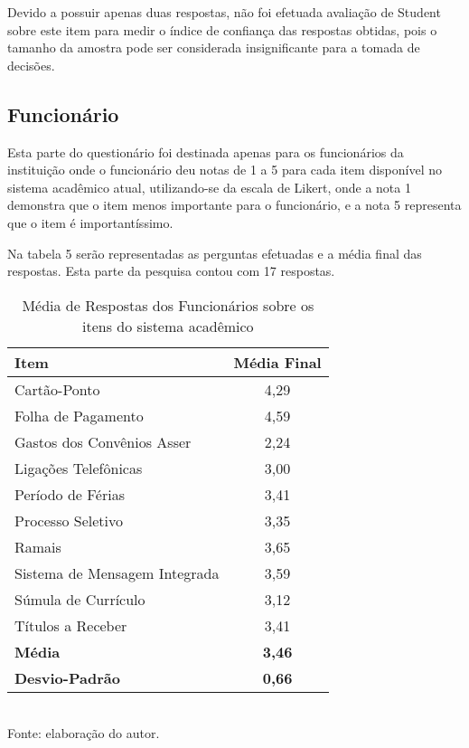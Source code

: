 Devido a possuir apenas duas respostas, não foi efetuada avaliação de Student sobre este item para medir o índice de confiança das respostas obtidas, pois o tamanho da amostra pode ser considerada insignificante para a tomada de decisões.


\subsection{Funcionário}
Esta parte do questionário foi destinada apenas para os funcionários da instituição onde o funcionário deu notas de 1 a 5 para cada item disponível no sistema acadêmico atual, utilizando-se da escala de Likert, onde  a nota 1 demonstra que o item menos importante para o funcionário, e a nota 5 representa que o item é importantíssimo.

Na tabela 5 serão representadas as perguntas efetuadas e a média final das respostas. Esta parte da pesquisa contou com 17 respostas.

\begin{table}[!hbt]
\centering
\caption[Média de Respostas dos Funcionários]{Média de Respostas dos Funcionários sobre os itens do sistema acadêmico}
\vspace{3mm}
\begin{tabular}{p{9.5cm}|c}\hline
\textbf{Item} & \textbf{Média Final} \\ \hline
Cartão-Ponto & 4,29 \\ \hline
Folha de Pagamento & 4,59 \\ \hline
Gastos dos Convênios Asser & 2,24 \\ \hline
Ligações Telefônicas & 3,00 \\ \hline
Período de Férias & 3,41 \\ \hline
Processo Seletivo & 3,35 \\ \hline
Ramais & 3,65 \\ \hline
Sistema de Mensagem Integrada & 3,59 \\ \hline
Súmula de Currículo & 3,12 \\ \hline
Títulos a Receber & 3,41 \\ \hline
\textbf{Média} & \textbf{3,46} \\ \hline
\textbf{Desvio-Padrão} & \textbf{0,66} \\ \hline
\end{tabular}
\\ Fonte: elaboração do autor.
\end{table}

